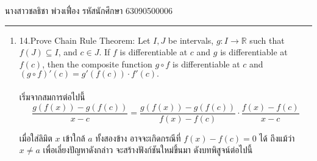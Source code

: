 \documentclass[12pt, a4paper]{article}
\begin{document}
\raggedleft นางสาวชลธิชา พ่วงเฟื่อง  รหัสนักศึกษา 63090500006 \\[12pt]
\hrule\vspace{12pt}
\raggedright

\begin{enumerate}
    \item 14.Prove Chain Rule Theorem: Let $I,J$ be intervals, $g : I\rightarrow \mathbb{R} $ such that $f\left ( J \right )\subseteq I$, and $ c\in J.$
    If $f$ is differentiable at $c$ and $g$ is differentiable at $f\left ( c \right )$, then the composite function $g\circ f$
    is differentiable at $c $ and $ {\left (g\circ f  \right )}'\left ( c \right )={g}'\left ( f\left ( c \right ) \right )\cdot {f}'\left ( c \right ).$
    \\ \indent \\
    เริ่มจากสมการต่อไปนี้\\
    \hspace{1cm}$$\frac{g\left (f\left ( x \right )  \right )-g\left ( f\left ( c \right ) \right )}{x-c}=\frac{g\left (f\left ( x \right )  \right )-g\left ( f\left ( c \right ) \right )}{f\left (x  \right )-f\left (c  \right )}\cdot \frac{f\left (x  \right )-f\left (c  \right ) }{x-c}$$

    เมื่อใส่ลิมิต $x$ เข้าใกล้ $a$ ทั้งสองข้าง อาจจะเกิดกรณีที่ $f\left ( x \right )-f\left ( c \right )=0$ ได้ ถึงแม้ว่า $ x\neq a $ เพื่อเลี่ยงปัญหาดังกล่าว
    จะสร้างฟังก์ชันใหม่ขึ้นมา ดังบทพิสูจน์ต่อไปนี้ \\   



\end{enumerate}
\end{document}
